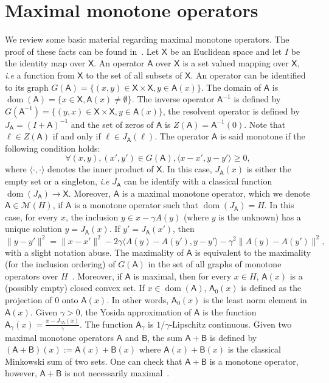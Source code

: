 \documentclass{article}
\newcommand{\sA}{{\mathsf A}}
\newcommand{\sB}{{\mathsf B}}
\newcommand{\maxmon}{{\mathscr M}}
\DeclareMathOperator{\dom}{dom}
\newcommand{\eqdef}{:=}
\newcommand{\sX}{{\mathsf X}}
\newcommand{\ps}[1]{\langle #1 \rangle}
\theoremstyle{definition}
\begin{document}
\section{Maximal monotone operators}
We review some basic material regarding maximal monotone operators. The proof of these facts can be found in~\cite{bau-com-livre11}.
Let $\sX$ be an Euclidean space and let $I$ be the identity map over $\sX$. An operator $\sA$ over $\sX$ is a set valued mapping over $\sX$, \textit{i.e} a function from $\sX$ to the set of all subsets of $\sX$. An operator can be identified to its graph $G(\sA) = \{(x,y) \in \sX \times \sX, y \in \sA(x)\}$. The domain of $\sA$ is $\dom(\sA) = \{x \in \sX, \sA(x) \neq \emptyset\}$. The inverse operator $\sA^{-1}$ is defined by $G(\sA^{-1}) = \{(y,x) \in \sX \times \sX, y \in \sA(x)\}$, the resolvent operator is defined by $J_{\sA} = (I+\sA)^{-1}$ and the set of zeros of $\sA$ is $Z(\sA) = \sA^{-1}(0)$. Note that $\ell \in Z(\sA)$ if and only if $\ell \in J_\sA(\ell)$. The operator $\sA$ is said monotone if the following condition holds: 
\begin{equation*}
\forall (x,y),(x',y') \in G(\sA), \ps{x-x',y-y'} \geq 0,
\end{equation*}
where $\ps{\cdot,\cdot}$ denotes the inner product of $\sX$. In this case, $J_{\sA}(x)$ is either the empty set or a singleton, \textit{i.e} $J_{\sA}$ can be identify with a classical function $\dom(J_{\sA}) \to \sX$.
Moreover, $\sA$ is a maximal monotone operator, which we denote $\sA \in \maxmon(H)$, if $\sA$ is a monotone operator such that $\dom(J_{\sA}) = H$. In this case, for every $x$, the inclusion $y \in x - \gamma A(y)$ (where $y$ is the unknown) has a unique solution $y = J_{\sA}(x)$. If $y' = J_{\sA}(x')$, then
$$
\|y-y'\|^2 = \|x-x'\|^2 - 2\gamma\ps{A(y)-A(y'),y-y'} - \gamma^2\|A(y)-A(y')\|^2,
$$
with a slight notation abuse.
The maximality of $\sA$ is equivalent to the maximality (for the inclusion ordering) of $G(\sA)$ in the set of all graphs of monotone operators over $H$~\cite{minty1962monotone}. Moreover, if $\sA$ is maximal, then for every $x \in H$, $\sA(x)$ is a (possibly empty) closed convex set. If $x \in \dom(\sA)$, $\sA_0(x)$ is defined as the projection of $0$ onto $\sA(x)$. In other words, $\sA_0(x)$ is the least norm element in $\sA(x)$. Given $\gamma > 0$, the Yosida approximation of $\sA$ is the function $\sA_\gamma(x) = \frac{x - J_{\gamma\sA}(x)}{\gamma}$. The function $\sA_\gamma$ is $1/\gamma$-Lipschitz continuous. Given two maximal monotone operators $\sA$ and $\sB$, the sum $\sA + \sB$ is defined by $(\sA + \sB)(x) \eqdef \sA(x) + \sB(x)$ where $\sA(x) + \sB(x)$ is the classical Minkowski sum of two sets. One can check that $\sA + \sB$ is a monotone operator, however, $\sA + \sB$ is not necessarily maximal~\cite[Page 54]{phelps2009convex}. 
\end{document}

